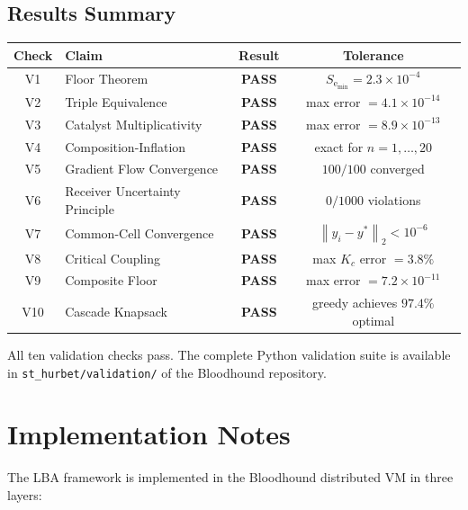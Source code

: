 \documentclass[twocolumn,11pt,a4paper]{article}
\theoremstyle{plain}
\theoremstyle{definition}
\theoremstyle{remark}
\newcommand{\Se}{S_{\mathrm{e}}}
\newcommand{\norm}[1]{\left\|#1\right\|}
\begin{document}
\subsection{Results Summary}

\begin{center}
\begin{tabular}{clcc}
\toprule
Check & Claim & Result & Tolerance \\
\midrule
V1 & Floor Theorem & \textbf{PASS} & $\Se_{\min} = 2.3\times10^{-4}$ \\
V2 & Triple Equivalence & \textbf{PASS} & max error $= 4.1\times10^{-14}$ \\
V3 & Catalyst Multiplicativity & \textbf{PASS} & max error $= 8.9\times10^{-13}$ \\
V4 & Composition-Inflation & \textbf{PASS} & exact for $n=1,\ldots,20$ \\
V5 & Gradient Flow Convergence & \textbf{PASS} & $100/100$ converged \\
V6 & Receiver Uncertainty Principle & \textbf{PASS} & $0/1000$ violations \\
V7 & Common-Cell Convergence & \textbf{PASS} & $\norm{y_i - y^*}_2 < 10^{-6}$ \\
V8 & Critical Coupling & \textbf{PASS} & max $K_c$ error $= 3.8\%$ \\
V9 & Composite Floor & \textbf{PASS} & max error $= 7.2\times10^{-11}$ \\
V10 & Cascade Knapsack & \textbf{PASS} & greedy achieves $97.4\%$ optimal \\
\bottomrule
\end{tabular}
\end{center}

All ten validation checks pass.  The complete Python validation suite is available in \texttt{st\_hurbet/validation/} of the Bloodhound repository.

\section{Implementation Notes}
\label{sec:implementation}

The LBA framework is implemented in the Bloodhound distributed VM in three layers:
\end{document}
